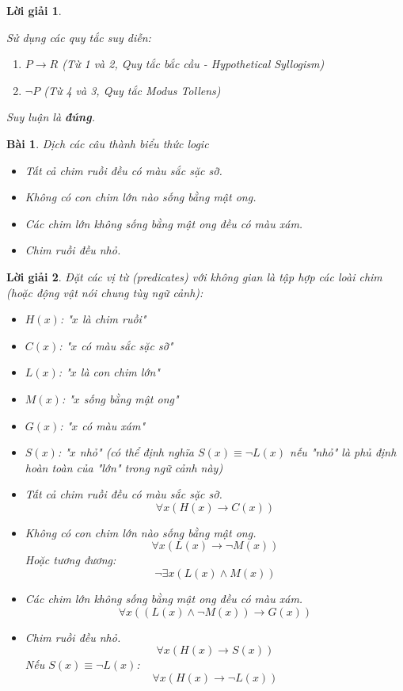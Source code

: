 \documentclass[11pt, oneside, a4paper]{article}
\newtheorem{bt}{Bài}[section]
\newtheorem{loigiai}{Lời giải}[bt]
\begin{document}
\begin{loigiai}
\begin{itemize}
        Sử dụng các quy tắc suy diễn:
        \begin{enumerate}
            \item[4.] $P \rightarrow R$ (Từ 1 và 2, Quy tắc bắc cầu - Hypothetical Syllogism)
            \item[5.] $\lnot P$ (Từ 4 và 3, Quy tắc Modus Tollens)
        \end{enumerate}
        Suy luận là \textbf{đúng}.
    \end{itemize}
    \end{loigiai}
    
    \begin{bt}
    Dịch các câu thành biểu thức logic
    \begin{itemize}
    \item[a)] Tất cả chim ruồi đều có màu sắc sặc sỡ.
    \item[b)] Không có con chim lớn nào sống bằng mật ong.
    \item[c)] Các chim lớn không sống bằng mật ong đều có màu xám.
    \item[d)] Chim ruồi đều nhỏ.
    \end{itemize}
    \end{bt}
    
    \begin{loigiai}
    Đặt các vị từ (predicates) với không gian là tập hợp các loài chim (hoặc động vật nói chung tùy ngữ cảnh):
    \begin{itemize}
        \item $H(x)$: "$x$ là chim ruồi"
        \item $C(x)$: "$x$ có màu sắc sặc sỡ"
        \item $L(x)$: "$x$ là con chim lớn"
        \item $M(x)$: "$x$ sống bằng mật ong"
        \item $G(x)$: "$x$ có màu xám"
        \item $S(x)$: "$x$ nhỏ" (có thể định nghĩa $S(x) \equiv \lnot L(x)$ nếu "nhỏ" là phủ định hoàn toàn của "lớn" trong ngữ cảnh này)
    \end{itemize}
    \begin{itemize}
     \item[a)] Tất cả chim ruồi đều có màu sắc sặc sỡ.
        $$ \forall x (H(x) \rightarrow C(x)) $$
     \item[b)] Không có con chim lớn nào sống bằng mật ong.
        $$ \forall x (L(x) \rightarrow \lnot M(x)) $$
        Hoặc tương đương:
        $$ \lnot \exists x (L(x) \land M(x)) $$
     \item[c)] Các chim lớn không sống bằng mật ong đều có màu xám.
        $$ \forall x ((L(x) \land \lnot M(x)) \rightarrow G(x)) $$
     \item[d)] Chim ruồi đều nhỏ.
        $$ \forall x (H(x) \rightarrow S(x)) $$
        Nếu $S(x) \equiv \lnot L(x)$:
        $$ \forall x (H(x) \rightarrow \lnot L(x)) $$
    \end{itemize}
    \end{loigiai}
    
\end{document}
